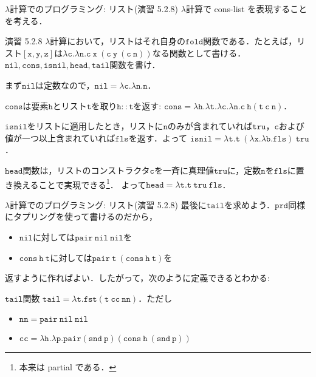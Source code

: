 \documentclass[9pt]{beamer}
\begin{document}
\begin{frame}{$\lambda$計算でのプログラミング: リスト(演習 5.2.8)}
	$\lambda$計算で cons-list を表現することを考える．
	\begin{tblock}{演習 5.2.8}
		$\lambda$計算において，リストはそれ自身の$\mathtt{fold}$関数である．たとえば，リスト$\mathtt{\left[x, y, z\right]}$は$\mathtt{\lambda c.\lambda n. c\ x\ (c\ y\ (c\ n))}$なる関数として書ける．$\mathtt{nil}, \mathtt{cons}, \mathtt{isnil}, \mathtt{head}, \mathtt{tail}$関数を書け．
	\end{tblock}
まず$\mathtt{nil}$は定数なので，$\mathtt{nil = \lambda c. \lambda n. n}$．

$\mathtt{cons}$は要素$\mathtt{h}$とリスト$\mathtt{t}$を取り$\mathtt{h :: t}$を返す: $\mathtt{cons = \lambda h. \lambda t. \lambda c. \lambda n. c\ h (t\ c\ n)}$．

$\mathtt{isnil}$をリストに適用したとき，リストに$\mathtt{n}$のみが含まれていれば$\mathtt{tru}$，$\mathtt{c}$および値が一つ以上含まれていれば$\mathtt{fls}$を返す．よって
$\mathtt{isnil = \lambda t. t\ (\lambda x.\lambda b. fls)\ tru}$．

$\mathtt{head}$関数は，リストのコンストラクタ$\mathtt{c}$を一斉に真理値$\mathtt{tru}$に，定数$\mathtt{n}$を$\mathtt{fls}$に置き換えることで実現できる\footnote{本来は partial である．}．
よって$\mathtt{head = \lambda t. t\ tru\ fls}$．
\end{frame}
\begin{frame}{$\lambda$計算でのプログラミング: リスト(演習 5.2.8)}
	最後に$\mathtt{tail}$を求めよう．$\mathtt{prd}$同様にタプリングを使って書けるのだから，\begin{itemize}
	\item $\mathtt{nil}$に対しては$\mathtt{pair\ nil\ nil}$を
	\item $\mathtt{cons\ h\ t}$に対しては$\mathtt{pair\ t\ (cons\ h\ t)}$を
	\end{itemize}
	返すように作ればよい．したがって，次のように定義できるとわかる:
	\begin{tblock}{$\mathtt{tail}$関数}
		$\mathtt{tail = \lambda t. fst(t\ cc\ nn)}$．ただし\begin{itemize}
			\item $\mathtt{nn = pair\ nil\ nil}$
			\item $\mathtt{cc = \lambda h. \lambda p. pair(snd\ p)(cons\ h\ (snd\ p))}$
		\end{itemize}
	\end{tblock}
\end{frame}
\end{document}
